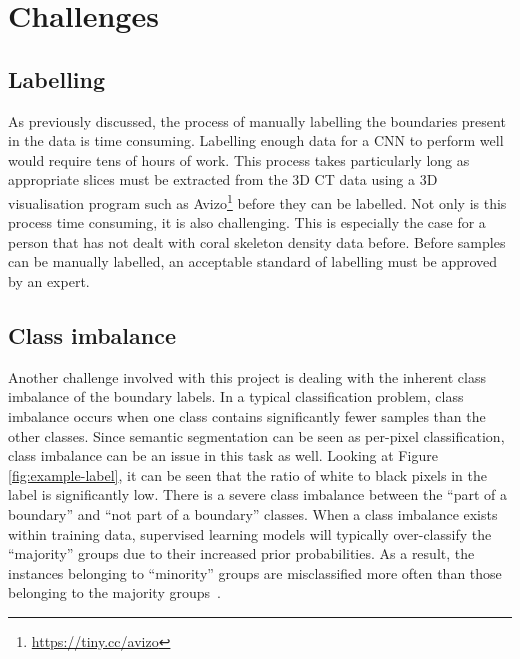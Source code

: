 \section{Challenges}


\subsection{Labelling}

As previously discussed, the process of manually labelling the boundaries present in the data is time consuming. Labelling enough data for a CNN to perform well would require tens of hours of work. This process takes particularly long as appropriate slices must be extracted from the 3D CT data using a 3D visualisation program such as Avizo\footnote{\url{https://tiny.cc/avizo}} before they can be labelled. Not only is this process time consuming, it is also challenging. This is especially the case for a person that has not dealt with coral skeleton density data before. Before samples can be manually labelled, an acceptable standard of labelling must be approved by an expert.

\subsection{Class imbalance}

Another challenge involved with this project is dealing with the inherent class imbalance of the boundary labels. In a typical classification problem, class imbalance occurs when one class contains significantly fewer samples than the other classes. Since semantic segmentation can be seen as per-pixel classification, class imbalance can be an issue in this task as well. Looking at Figure \ref{fig:example-label}, it can be seen that the ratio of white to black pixels in the label is significantly low. There is a severe class imbalance between the ``part of a boundary'' and ``not part of a boundary'' classes. When a class imbalance exists within training data, supervised learning models will typically over-classify the ``majority'' groups due to their increased prior probabilities. As a result, the instances belonging to ``minority'' groups are misclassified more often than those belonging to the majority groups~\cite{classimbalance}.

